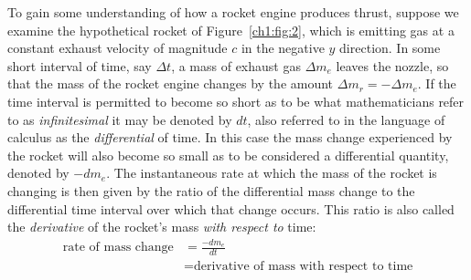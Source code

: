 To gain some understanding of how a rocket engine produces thrust, suppose we examine the
hypothetical rocket of Figure~\ref{ch1:fig:2}, which is emitting gas at a constant exhaust
velocity of magnitude $c$ in the negative $y$ direction. In some short interval of time, say
$\Delta t$, a mass of exhaust gas $\Delta m_e$ leaves the nozzle, so that the mass of the rocket
engine changes by the amount $\Delta m_r = -\Delta m_e$. If the time interval is permitted to
become so short as to be what mathematicians refer to as \emph{infinitesimal} it may be denoted
by $dt$, also referred to in the language of calculus as the \emph{differential} of time. In this
case the mass change experienced by the rocket will also become so small as to be considered a
differential quantity, denoted by $-dm_e$. The instantaneous rate at which the mass of the rocket
is changing is then given by the ratio of the differential mass change to the differential time
interval over which that change occurs. This ratio is also called the \emph{derivative} of the
rocket's mass \emph{with respect to} time:
\begin{align*}
\text{rate of mass change} &= \frac{-dm_e}{dt}\\
&= \text{derivative of mass with respect to time}
\end{align*}

